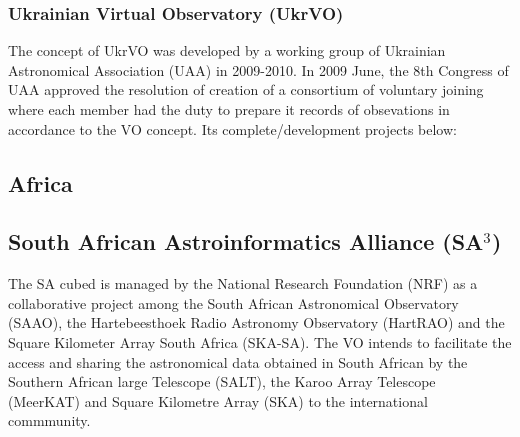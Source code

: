 \subsubsection{Ukrainian Virtual Observatory (UkrVO)}
The concept of UkrVO \cite{website:ukrvo-home} was developed by a working group
of Ukrainian Astronomical Association (UAA) in 2009-2010. In 2009 June, the 8th
Congress of UAA approved the resolution of creation of a consortium of voluntary
joining where each member had the duty to prepare it records of obsevations in
accordance to the VO concept. Its complete/development projects below:

\begin{comment}
\begin{itemize}
\item \textbf{Variable Star Calculator}:

\item \textbf{Database of Golosiiv Plate Archive (DBGPA)}:

\item \textbf{CoLiTec (CLT)}:

\item \textbf{Joint Digital Archive (JDA)}:

\item \textbf{FON Astrographic Catalogue (FONAC)}:

\item \textbf{Mykolaiv Astronomical Observatory (MykAO) digital archive}:

\item \textbf{Variable Star Calculator}:

\item \textbf{Variable Star Calculator}:

\item \textbf{Variable Star Calculator}:
\end{itemize}
\end{comment}

\subsection{Africa}
\subsection{South African Astroinformatics Alliance (SA$ ^{3}  $)}
The SA cubed \cite{website:sa3-home} is managed by the National Research
Foundation (NRF) as a collaborative project among the South African Astronomical
Observatory (SAAO), the Hartebeesthoek Radio Astronomy Observatory (HartRAO) and
the Square Kilometer Array South Africa (SKA-SA). The VO intends to facilitate
the access and sharing the astronomical data obtained in South African by the
Southern African large Telescope (SALT), the Karoo Array Telescope (MeerKAT) and
Square Kilometre Array (SKA) to the international commmunity. %

